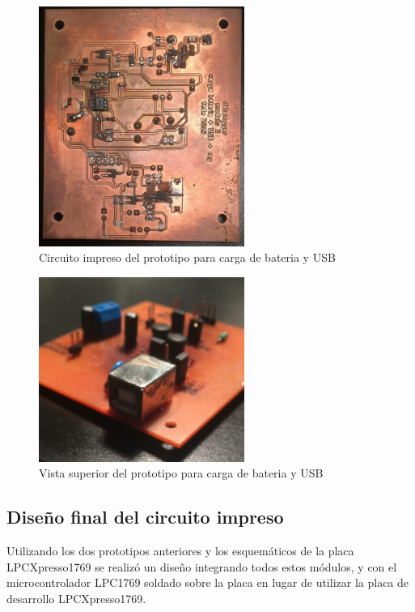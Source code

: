 \begin{figure}[!htbp]
	\centering	
	\includegraphics[angle = 90, width=0.6\textwidth]{./Figures/pcbBateriaInf.jpeg}			
	\caption{Circuito impreso del prototipo para carga de bateria y USB}
	\label{fig:pcbBateriaInf}
\end{figure}

\begin{figure}[!htbp]
	\centering	
	\includegraphics[width=0.6\textwidth]{./Figures/pcbBateriaSup.jpeg}			
	\caption{Vista superior del prototipo para carga de bateria y USB}
	\label{fig:pcbBateriaSup}
\end{figure}


\subsection{Diseño final del circuito impreso}

Utilizando los dos prototipos anteriores y los esquemáticos de la placa LPCXpresso1769 \citep{ea2011} se realizó un diseño integrando todos estos módulos, y con el microcontrolador LPC1769 soldado sobre la placa en lugar de utilizar la placa de desarrollo LPCXpresso1769. 

